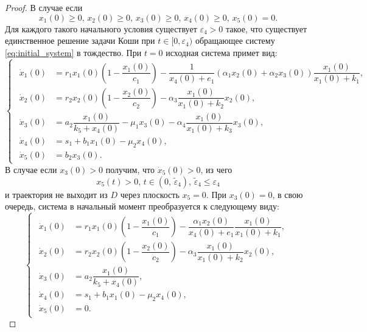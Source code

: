 \documentclass[14pt,a4paper]{extarticle}
\begin{document}
\begin{proof}
		В случае если 
		\begin{equation}\label{eq:conds_4}
			x_1(0)\ge0,\, x_2(0)\ge0,\, x_3(0)\ge0,\, x_4(0)\ge0,\, x_5(0)=0.
		\end{equation}
		Для каждого такого начального условия существует $\varepsilon_4>0$ такое, что существует единственное решение задачи Коши при $t\in[0,\varepsilon_4)$ обращающее систему \ref{eq:initial_system} в тождество. При $t=0$ исходная система примет вид:
		\begin{equation*}
			\begin{cases}
				\begin{aligned}
					\dot{x}_1(0) &= r_1x_1(0)\left(1-\dfrac{x_1(0)}{c_1}\right)-\dfrac{1}{x_4(0)+e_1}(\alpha_1x_2(0)+\alpha_2x_3(0))\dfrac{x_1(0)}{x_1(0)+k_1},\\
					\dot{x}_2(0) &= r_2x_2(0)\left(1-\dfrac{x_2(0)}{c_2}\right)-\alpha_3\dfrac{x_1(0)}{x_1(0)+k_2}x_2(0),\\
					\dot{x}_3(0) &= a_2\dfrac{x_1(0)}{k_5+x_4(0)}-\mu_1x_3(0)-\alpha_4\dfrac{x_1(0)}{x_1(0)+k_3}x_3(0),\\
					\dot{x}_4(0) &= s_1 + b_1x_1(0)-\mu_2x_4(0),\\
					\dot{x}_5(0) &= b_2x_3(0).
				\end{aligned}
			\end{cases}
		\end{equation*}
		В случае если $x_3(0)>0$ получим, что $\dot{x}_5(0)>0$, из чего 
		\[x_5(t)>0,\, t\in(0,\, \tilde{\varepsilon}_4),\,\tilde{\varepsilon}_4\le\varepsilon_4\]
		и траектория не выходит из $D$ через плоскость $x_5=0$. При $x_3(0)=0$, в свою очередь, система в начальный момент преобразуется к следующему виду:
		\begin{equation*}
			\begin{cases}
				\begin{aligned}
					\dot{x}_1(0) &= r_1x_1(0)\left(1-\dfrac{x_1(0)}{c_1}\right)-\dfrac{\alpha_1x_2(0)}{x_4(0)+e_1}\dfrac{x_1(0)}{x_1(0)+k_1},\\
					\dot{x}_2(0) &= r_2x_2(0)\left(1-\dfrac{x_2(0)}{c_2}\right)-\alpha_3\dfrac{x_1(0)}{x_1(0)+k_2}x_2(0),\\
					\dot{x}_3(0) &= a_2\dfrac{x_1(0)}{k_5+x_4(0)},\\
					\dot{x}_4(0) &= s_1 + b_1x_1(0)-\mu_2x_4(0),\\
					\dot{x}_5(0) &= 0.
				\end{aligned}
			\end{cases}
		\end{equation*} 

\end{proof}
\end{document}
